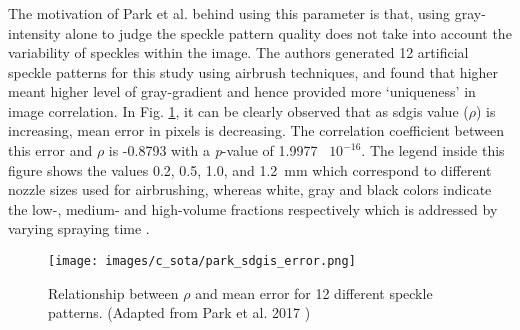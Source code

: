     \subsubsection{}
        The motivation of Park et al. behind using this parameter is that, using gray-intensity alone to judge the speckle pattern quality does not take into account the variability of speckles within the image. The authors generated 12 artificial speckle patterns for this study using airbrush techniques, and found that higher  meant higher level of gray-gradient and hence provided more `uniqueness' in image correlation. In Fig. \ref{fig:park_sdgis_error.png}, it can be clearly observed that as \gls{sdgis} value ($\rho$) is increasing, mean error in pixels is decreasing. The correlation coefficient between this error and $\rho$ is -0.8793 with a \emph{p}-value of 1.9977 \times\ $10^{-16}$. The legend inside this figure shows the values 0.2, 0.5, 1.0, and \SI{1.2}{\milli\meter} which correspond to different nozzle sizes used for airbrushing, whereas white, gray and black colors indicate the low-, medium- and high-volume fractions respectively which is addressed by varying spraying time \cite{park_sdgis}.

        \begin{figure}[ht] 
            \centering
            \texttt{[image: images/c\_sota/park\_sdgis\_error.png]}
            \caption{Relationship between $\rho$ and mean error for 12 different speckle patterns. (Adapted from Park et al. 2017 \cite{park_sdgis})}
            \label{fig:park_sdgis_error.png}
        \end{figure}
            
        


